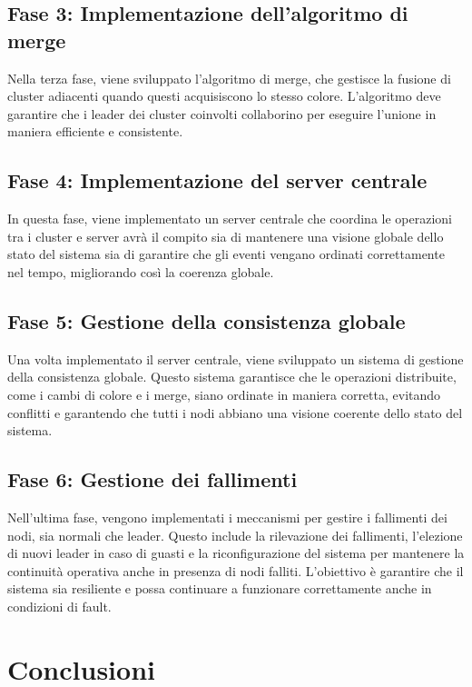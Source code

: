 \documentclass[12pt, a4paper]{report}
\begin{document}
\subsection*{Fase 3: Implementazione dell'algoritmo di merge}

Nella terza fase, viene sviluppato l'algoritmo di merge, che gestisce la fusione di cluster adiacenti quando questi acquisiscono lo stesso colore. L'algoritmo deve garantire che i leader dei cluster coinvolti collaborino per eseguire l'unione in maniera efficiente e consistente.

\subsection*{Fase 4: Implementazione del server centrale}

In questa fase, viene implementato un server centrale che coordina le operazioni tra i cluster e server avr\`a il compito sia di mantenere una visione globale dello stato del sistema sia di garantire che gli eventi vengano ordinati correttamente nel tempo, migliorando così la coerenza globale.

\subsection*{Fase 5: Gestione della consistenza globale}

Una volta implementato il server centrale, viene sviluppato un sistema di gestione della consistenza globale. Questo sistema garantisce che le operazioni distribuite, come i cambi di colore e i merge, siano ordinate in maniera corretta, evitando conflitti e garantendo che tutti i nodi abbiano una visione coerente dello stato del sistema.

\subsection*{Fase 6: Gestione dei fallimenti}

Nell'ultima fase, vengono implementati i meccanismi per gestire i fallimenti dei nodi, sia normali che leader. Questo include la rilevazione dei fallimenti, l'elezione di nuovi leader in caso di guasti e la riconfigurazione del sistema per mantenere la continuit\`a operativa anche in presenza di nodi falliti. L'obiettivo \`e garantire che il sistema sia resiliente e possa continuare a funzionare correttamente anche in condizioni di fault.

\section{Conclusioni}
\end{document}
